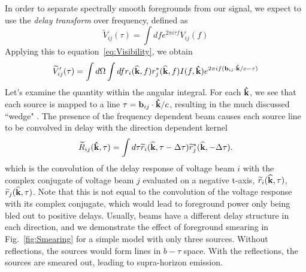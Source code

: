 \documentclass[onecolumn]{emulateapj}
\begin{document}
In order to separate spectrally smooth foregrounds from our signal, we expect to use the {\it delay transform} over frequency, defined as \citep{Parsons:2012}
\begin{equation}
\widetilde{V}_{ij}(\tau) = \int d f e^{2 \pi i \tau f} V_{ij}(f)
\end{equation}
Applying this to equation~\ref{eq:Visibility}, we obtain
\begin{equation}
\widetilde{V}'_{ij}(\tau)=  \int d \Omega \int d f  r_i({\bf \widehat{k}},f) r_j^*({\bf \widehat{k}},f)  I(f,{\bf \hat{k}}) e^{2 \pi i f ( {\bf b}_{ij} \cdot {\bf \hat{k}} /c - \tau)}
\end{equation}
Let's examine the quantity within the angular integral. For each ${\bf \hat{k}}$, we see that each source is mapped to a line $\tau ={\bf b}_{ij}\cdot{\bf \hat{k}}/c$, resulting in the much discussed ``wedge" \citep{Datta:2010,Vedantham:2012,Parsons:2012,Morales:2013,Thyagarajan:2013,Liu:2014a,Liu:2014b}. The presence of the frequency dependent beam causes each source line to be convolved in delay with the direction dependent kernel
\begin{equation}\label{eq:Kernel}
\widetilde{R}_{ij}({\bf \hat{k}},\tau) = \int d \tau \widetilde{r}_i({\bf \widehat{k}},\tau - \Delta \tau) \widetilde{r}^*_j({\bf \widehat{k}},-\Delta \tau).
\end{equation}
which is the convolution of the delay response of voltage beam $i$ with the complex conjugate of voltage beam $j$ evaluated on a negative t-axis, $\widetilde{r}_i({\bf \widehat{k}},\tau)$,$\widetilde{r}_j({\bf \widehat{k}},\tau)$. Note that this is not equal to the convolution of the voltage response with its complex conjugate, which would lead to foreground power only being bled out to positive delays. Usually, beams have a different delay structure in each direction, and we demonstrate the effect of foreground smearing in Fig.~\ref{fig:Smearing} for a simple model with only three sources. Without reflections, the sources would form lines in $b-\tau$ space. With the reflections, the sources are smeared out, leading to supra-horizon emission. 
\end{document}
